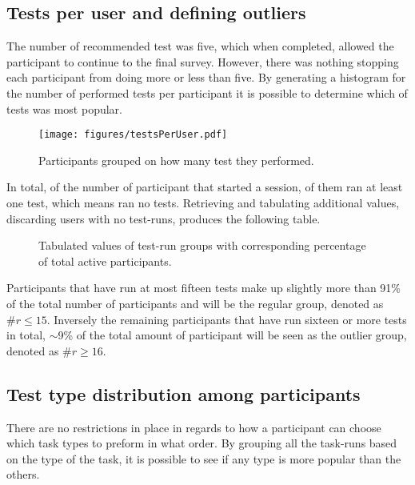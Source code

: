   \newpage
  \subsection{Tests per user and defining outliers}

    The number of recommended test was five, which when completed, allowed
    the participant to continue to the final survey. However, there was
    nothing stopping each participant from doing more or less than five.
    By generating a histogram for the number of performed tests per
    participant it is possible to determine which of tests was most
    popular.

    \begin{figure}[h!]
      \centering
      \texttt{[image: figures/testsPerUser.pdf]}
      \caption{Participants grouped on how many test they performed.}
    \end{figure}

    In total, of the  number of participant that
    started a session,  of them ran at least one
    test, which means  ran no tests. Retrieving and
    tabulating additional values, discarding users with no test-runs,
    produces the following table.

    \begin{figure}[h!]
      \centering
      \caption{%
        Tabulated values of test-run groups with corresponding percentage
        of total active participants.%
      }
    \end{figure}

    Participants that have run at most fifteen tests make up slightly more
    than 91\% of the total number of participants and will be the regular
    group, denoted as $\#r\leq15$. Inversely the remaining participants
    that have run sixteen or more tests in total, $\sim$9\% of the total
    amount of participant will be seen as the outlier group, denoted as
    $\#r\geq16$.

  \subsection{Test type distribution among participants}

    There are no restrictions in place in regards to how a participant
    can choose which task types to preform in what order. By grouping all
    the task-runs based on the type of the task, it is possible to see if
    any type is more popular than the others.

